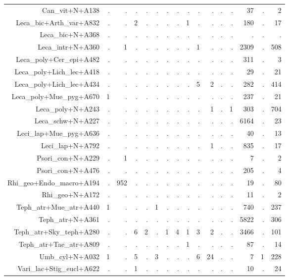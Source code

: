\documentclass[a4paper, 11]{article}\usepackage[]{graphicx}\usepackage[]{color}
\begin{document}
\begin{table}
\begin{tabular}{rrrrrrrrrrrrrrrr}
  Can\_vit+N+A138 & . & . & . & . & . & . & . & . & . & . & . & . & 37 & . & 2 \\ 
  Leca\_bic+Arth\_var+A832 & . & . & 2 & . & . & . & . & 1 & . & . & . & . & 180 & . & 17 \\ 
  Leca\_bic+N+A368 & . & . & . & . & . & . & . & . & . & . & . & . & . & . & . \\ 
  Leca\_intr+N+A360 & . & 1 & . & . & . & . & . & . & 1 & . & . & . & 2309 & . & 508 \\ 
  Leca\_poly+Cer\_epi+A482 & . & . & . & . & . & . & . & . & . & . & . & . & 311 & . & 3 \\ 
  Leca\_poly+Lich\_lec+A418 & . & . & . & . & . & . & . & . & . & . & . & . & 29 & . & 21 \\ 
  Leca\_poly+Lich\_lec+A434 & . & . & . & . & . & . & . & . & 5 & 2 & . & . & 282 & . & 414 \\ 
  Leca\_poly+Mue\_pyg+A670 & 1 & . & . & . & . & . & . & . & . & . & . & . & 237 & . & 21 \\ 
  Leca\_poly+N+A243 & . & . & . & . & . & . & . & . & . & 1 & . & 1 & 303 & . & 704 \\ 
  Leca\_schw+N+A227 & . & . & . & . & . & . & . & . & . & . & . & . & 6164 & . & 23 \\ 
  Leci\_lap+Mue\_pyg+A636 & . & . & . & . & . & . & . & . & . & . & . & . & 40 & . & 13 \\ 
  Leci\_lap+N+A792 & . & . & . & . & . & . & . & . & . & 1 & . & . & 835 & . & 17 \\ 
  Psori\_con+N+A229 & . & 1 & . & . & . & . & . & . & . & . & . & . & 7 & . & 2 \\ 
  Psori\_con+N+A476 & . & . & . & . & . & . & . & . & . & . & . & . & 205 & . & 4 \\ 
  Rhi\_geo+Endo\_macro+A194 & . & 952 & . & . & . & . & . & . & . & . & . & . & 19 & . & 80 \\ 
  Rhi\_geo+N+A172 & . & . & . & . & . & . & . & . & . & . & . & . & 11 & . & 2 \\ 
  Teph\_atr+Mue\_atr+A440 & 1 & . & . & . & 1 & . & . & . & . & . & . & . & 740 & . & 237 \\ 
  Teph\_atr+N+A361 & . & . & . & . & . & . & . & . & . & . & . & . & 5822 & . & 306 \\ 
  Teph\_atr+Sky\_teph+A280 & . & . & 6 & 2 & . & 1 & 4 & 1 & 3 & 2 & . & . & 3466 & . & 101 \\ 
  Teph\_atr+Tae\_atr+A809 & . & . & . & . & . & . & . & 1 & . & . & . & . & 87 & . & 14 \\ 
  Umb\_cyl+N+A032 & 1 & . & 5 & . & 3 & . & . & . & 6 & 24 & . & . & 7 & 1 & 228 \\ 
  Vari\_lac+Stig\_eucl+A622 & . & . & 1 & . & . & . & . & . & . & . & . & . & 10 & . & 24 \\ 
   \hline
\end{tabular}
\end{table}
\end{document}
